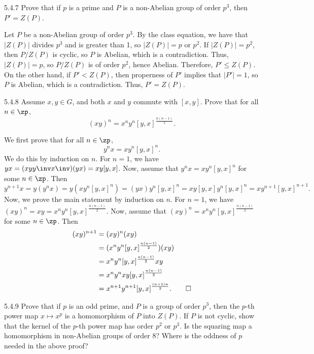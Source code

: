 \begin{exercise}{5.4.7}
    Prove that if $p$ is a prime and $P$ is a non-Abelian group of order $p^3$, then $P' = Z(P)$.
\end{exercise}

\begin{sol}
    Let $P$ be a non-Abelian group of order $p^3$.
	By the class equation, we have that $|Z(P)|$ divides $p^3$ and is greater than 1, so $|Z(P)| = p$ or $p^2$.
	If $|Z(P)| = p^2$, then $P/Z(P)$ is cyclic, so $P$ is Abelian, which is a contradiction.
	Thus, $|Z(P)| = p$, so $P/Z(P)$ is of order $p^2$, hence Abelian.
	Therefore, $P' \leq Z(P)$.
	On the other hand, if $P' < Z(P)$, then properness of $P'$ implies that $|P'| = 1$, so $P$ is Abelian, which is a contradiction.
	Thus, $P' = Z(P)$.
\end{sol}

\begin{exercise}{5.4.8}
    Assume $x, y \in G$, and both $x$ and $y$ commute with $[x, y]$.
	Prove that for all $n \in \zp$,
    \[
    	(xy)^n = x^n y^n [y, x]^{\frac{n(n-1)}{2}}.
    \]
\end{exercise}

\begin{sol}
    We first prove that for all $n \in \zp$,
    \[
    	y^nx = xy^n [y, x]^n.
    \]
    We do this by induction on $n$.
	For $n = 1$, we have $yx = (xyy\inv x\inv)(yx) = xy[y, x]$.
	Now, assume that $y^nx = xy^n [y, x]^n$ for some $n \in \zp$.
	Then
    \[
    	y^{n+1}x = y(y^nx) = y(xy^n [y, x]^n) = (yx)y^n [y, x]^n = xy[y, x]y^n [y, x]^n = xy^{n+1} [y, x]^{n+1}.
    \]
    Now, we prove the main statement by induction on $n$.
	For $n = 1$, we have $(xy)^n = xy = x^n y^n [y, x]^{\frac{n(n-1)}{2}}$.
	Now, assume that $(xy)^n = x^n y^n [y, x]^{\frac{n(n-1)}{2}}$ for some $n \in \zp$.
	Then
    \begin{align*}
        (xy)^{n+1} & = (xy)^n (xy) \\
        & = (x^n y^n [y, x]^{\frac{n(n-1)}{2}})(xy) \\
        & = x^n y^n [y, x]^{\frac{n(n-1)}{2}} x y \\
        & = x^n y^n x y [y, x]^{\frac{n(n-1)}{2}} \\
        & = x^{n+1} y^{n+1} [y, x]^{\frac{(n+1)n}{2}}. \qedhere
    \end{align*}
\end{sol}

\begin{exercise}{5.4.9}
    Prove that if $p$ is an odd prime, and $P$ is a group of order $p^3$, then the $p$-th power map $x \mapsto x^p$ is a homomorphism of $P$ into $Z(P)$.
	If $P$ is not cyclic, show that the kernel of the $p$-th power map has order $p^2$ or $p^3$.
	Is the squaring map a homomorphism in non-Abelian groups of order 8?
	Where is the oddness of $p$ needed in the above proof?
\end{exercise}

